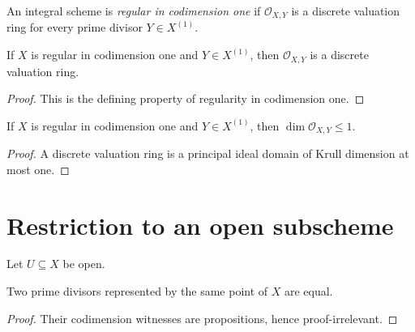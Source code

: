 \begin{definition}
  \label{mk-def:isRegularInCodimensionOne}
  \leanok


  An integral scheme is \emph{regular in codimension one} if
  \(\mathcal O_{X,Y}\) is a discrete valuation ring for every prime divisor
  \(Y\in X^{(1)}\).
\end{definition}

\begin{lemma}
  \label{mk-def:isRegularInCodimOne_dvrStalk}
  \leanok


  If \(X\) is regular in codimension one and \(Y\in X^{(1)}\), then
  \(\mathcal O_{X,Y}\) is a discrete valuation ring.
\end{lemma}
\begin{proof}
  \leanok
  This is the defining property of regularity in codimension one.
\end{proof}

\begin{lemma}
  \label{mk-def:isRegularInCodimOne_krullDimStalk}
  \leanok


  If \(X\) is regular in codimension one and \(Y\in X^{(1)}\), then
  \(\dim\mathcal O_{X,Y}\leq 1\).
\end{lemma}
\begin{proof}
  \leanok
  A discrete valuation ring is a principal ideal domain of Krull dimension
  at most one.
\end{proof}

\section{Restriction to an open subscheme}
\label{mk-sec:open_immersion_descent}

Let \(U\subseteq X\) be open.

\begin{lemma}
  \label{mk-lem:primeDivisor_ext}
  \leanok


  Two prime divisors represented by the same point of \(X\) are equal.
\end{lemma}
\begin{proof}
  \leanok
  Their codimension witnesses are propositions, hence proof-irrelevant.
\end{proof}


